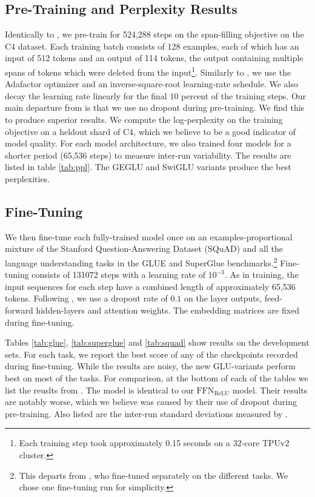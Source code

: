 \documentclass{article}
\begin{document}
\subsection{Pre-Training and Perplexity Results}
Identically to \citep{raffel2019exploring}, we pre-train for 524,288 steps on the span-filling objective on the C4 dataset.  Each training batch consists of 128 examples, each of which has an input of 512 tokens and an output of 114 tokens, the output containing multiple spans of tokens which were deleted from the input\footnote{Each training step took approximately 0.15 seconds on a 32-core TPUv2 cluster.}.  Similarly to \citep{raffel2019exploring}, we use the Adafactor optimizer \citep{shazeer2018adafactor} and an inverse-square-root learning-rate schedule.  We also decay the learning rate linearly for the final 10 percent of the training steps.   Our main departure from \citep{raffel2019exploring} is that we use no dropout during pre-training.  We find this to produce superior results. We compute the log-perplexity on the training objective on a heldout shard of C4, which we believe to be a good indicator of model quality.  For each model architecture, we also trained four models for a shorter period (65,536 steps) to measure inter-run variability.  The results are listed in table \ref{tab:ppl}.  The GEGLU and SwiGLU variants produce the best perplexities.

\subsection{Fine-Tuning}
We then fine-tune each fully-trained model once on an examples-proportional mixture of the Stanford Question-Answering Dataset (SQuAD) \citep{rajpurkar2016squad} and all the language understanding tasks in the GLUE \citep{wang2018glue} and SuperGlue \citep{wang2019superglue} benchmarks.\footnote{This departs from \citep{raffel2019exploring}, who fine-tuned separately on the different tasks.  We chose one fine-tuning run for simplicity.}  Fine-tuning consists of 131072 steps with a learning rate of $10^{-3}$.  As in training, the input sequences for each step have a combined length of approximately 65,536 tokens.  Following \citep{raffel2019exploring}, we use a dropout rate of $0.1$ on the layer outputs, feed-forward hidden-layers and attention weights.  The embedding matrices are fixed during fine-tuning.

Tables \ref{tab:glue}, \ref{tab:superglue} and \ref{tab:squad} show results on the development sets.  For each task, we report the best score of any of the checkpoints recorded during fine-tuning.  While the results are noisy, the new GLU-variants perform best on most of the tasks.  For comparison, at the bottom of each of the tables we list the reuslts from \citep{raffel2019exploring}.  The model is identical to our $\textrm{FFN}_\textrm{ReLU}$ model.  Their results are notably worse, which we believe was caused by their use of dropout during pre-training.  Also listed are the inter-run standard deviations measured by \citep{raffel2019exploring}.
\end{document}
